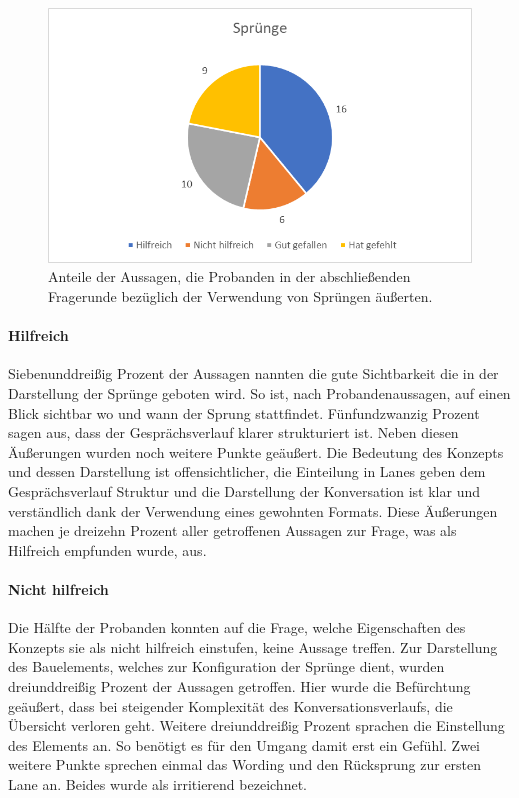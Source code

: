 \begin{figure}[h]
\centering
\includegraphics[width=1\textwidth]{pictures/diagramme/aussagenspr}
\caption{Anteile der Aussagen, die Probanden in der abschließenden Fragerunde bezüglich der Verwendung von Sprüngen äußerten.}
\label{aussagensichtb}
\end{figure}
 

\paragraph{Hilfreich} Siebenunddreißig Prozent der Aussagen nannten die gute Sichtbarkeit die in der Darstellung der Sprünge geboten wird. So ist, nach Probandenaussagen, auf einen Blick sichtbar wo und wann der Sprung stattfindet. Fünfundzwanzig Prozent sagen aus, dass der Gesprächsverlauf klarer strukturiert ist. Neben diesen Äußerungen wurden noch weitere Punkte geäußert. Die Bedeutung des Konzepts und dessen Darstellung ist offensichtlicher, die Einteilung in Lanes geben dem Gesprächsverlauf Struktur und die Darstellung der Konversation ist klar und verständlich dank der Verwendung eines gewohnten Formats. Diese Äußerungen machen je dreizehn Prozent aller getroffenen Aussagen zur Frage, was als Hilfreich empfunden wurde, aus.

\paragraph{Nicht hilfreich}Die Hälfte der Probanden konnten auf die Frage, welche Eigenschaften des Konzepts sie als nicht hilfreich einstufen, keine Aussage treffen. Zur Darstellung des Bauelements, welches zur Konfiguration der Sprünge dient, wurden dreiunddreißig Prozent der Aussagen getroffen. Hier wurde die Befürchtung geäußert, dass bei steigender Komplexität des Konversationsverlaufs, die Übersicht verloren geht. Weitere dreiunddreißig Prozent sprachen die Einstellung des Elements an. So benötigt es für den Umgang damit erst ein Gefühl. Zwei weitere Punkte sprechen einmal das Wording und den Rücksprung zur ersten Lane an. Beides wurde als irritierend bezeichnet.


